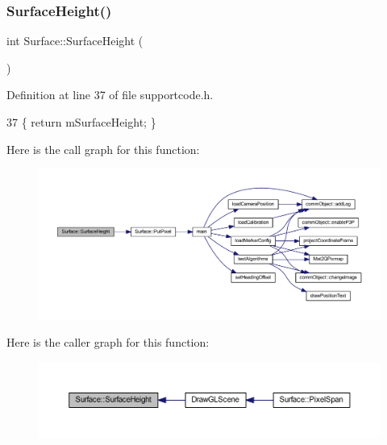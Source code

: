 \subsubsection{\texorpdfstring{Surface\+Height()}{SurfaceHeight()}}
{\footnotesize\ttfamily int Surface\+::\+Surface\+Height (\begin{DoxyParamCaption}{ }\end{DoxyParamCaption})\hspace{0.3cm}{\ttfamily [inline]}}



Definition at line 37 of file supportcode.\+h.


\begin{DoxyCode}
37 \{ \textcolor{keywordflow}{return} mSurfaceHeight; \}
\end{DoxyCode}
Here is the call graph for this function\+:\nopagebreak
\begin{figure}[H]
\begin{center}
\leavevmode
\includegraphics[width=350pt]{class_surface_a377c59f6ef131d4b879cda93578a3efa_cgraph}
\end{center}
\end{figure}
Here is the caller graph for this function\+:\nopagebreak
\begin{figure}[H]
\begin{center}
\leavevmode
\includegraphics[width=350pt]{class_surface_a377c59f6ef131d4b879cda93578a3efa_icgraph}
\end{center}
\end{figure}
\mbox{\label{class_surface_a4cbf23ea0c8ff533271109fc2a1a863d}} 
